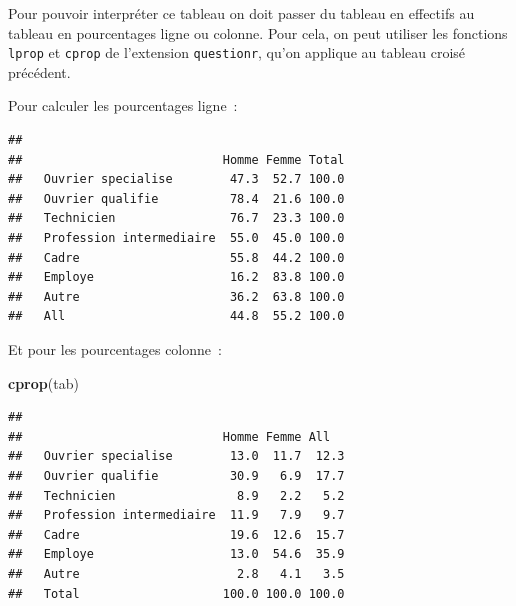 \documentclass[12pt,]{book}
\newenvironment{Shaded}{\begin{snugshade}}{\end{snugshade}}
\newcommand{\KeywordTok}[1]{\textcolor[rgb]{0.27,0.27,0.27}{\textbf{#1}}}
\newcommand{\NormalTok}[1]{#1}
\newcommand{\OperatorTok}[1]{\textcolor[rgb]{0.43,0.43,0.43}{\textbf{#1}}}
\newcommand{\StringTok}[1]{\textcolor[rgb]{0.5,0.5,0.5}{#1}}
\begin{document}
Pour pouvoir interpréter ce tableau on doit passer du tableau en effectifs au tableau en pourcentages ligne ou colonne. Pour cela, on peut utiliser les fonctions \texttt{lprop} et \texttt{cprop} de l'extension \texttt{questionr}, qu'on applique au tableau croisé précédent.

Pour calculer les pourcentages ligne~:

\begin{Shaded}
\end{Shaded}

\begin{verbatim}
##                           
##                            Homme Femme Total
##   Ouvrier specialise        47.3  52.7 100.0
##   Ouvrier qualifie          78.4  21.6 100.0
##   Technicien                76.7  23.3 100.0
##   Profession intermediaire  55.0  45.0 100.0
##   Cadre                     55.8  44.2 100.0
##   Employe                   16.2  83.8 100.0
##   Autre                     36.2  63.8 100.0
##   All                       44.8  55.2 100.0
\end{verbatim}

Et pour les pourcentages colonne~:

\begin{Shaded}
\begin{Highlighting}[]
\KeywordTok{cprop}\NormalTok{(tab)}
\end{Highlighting}
\end{Shaded}

\begin{verbatim}
##                           
##                            Homme Femme All  
##   Ouvrier specialise        13.0  11.7  12.3
##   Ouvrier qualifie          30.9   6.9  17.7
##   Technicien                 8.9   2.2   5.2
##   Profession intermediaire  11.9   7.9   9.7
##   Cadre                     19.6  12.6  15.7
##   Employe                   13.0  54.6  35.9
##   Autre                      2.8   4.1   3.5
##   Total                    100.0 100.0 100.0
\end{verbatim}
\end{document}
